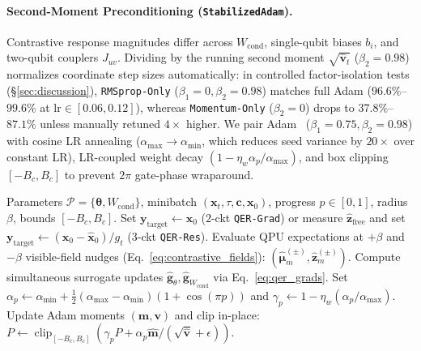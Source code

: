 \documentclass[11pt]{article}
\begin{document}
\paragraph{Second-Moment Preconditioning (\texttt{StabilizedAdam}).}
Contrastive response magnitudes differ across $W_{\text{cond}}$, single-qubit biases $b_i$, and two-qubit couplers $J_{uv}$. Dividing by the running second moment $\sqrt{\hat{\mathbf{v}}_t}$ ($\beta_2{=}0.98$) normalizes coordinate step sizes automatically: in controlled factor-isolation tests (\S\ref{sec:discussion}), \texttt{RMSprop-Only} ($\beta_1{=}0, \beta_2{=}0.98$) matches full Adam ($96.6\%$--$99.6\%$ at $\mathrm{lr}\in[0.06,0.12]$), whereas \texttt{Momentum-Only} ($\beta_2{=}0$) drops to $37.8\%$--$87.1\%$ unless manually retuned $4\times$ higher. We pair Adam~\cite{kingma2015adam} ($\beta_1{=}0.75, \beta_2{=}0.98$) with cosine LR annealing ($\alpha_{\max}{\to}\alpha_{\min}$, which reduces seed variance by $20\times$ over constant LR), LR-coupled weight decay $(1-\eta_w\alpha_p/\alpha_{\max})$, and box clipping $[-B_c, B_c]$ to prevent $2\pi$ gate-phase wraparound.

\begin{algorithm}[t!]
\caption{\texttt{QER-Grad} ($2$-Circuit) / \texttt{QER-Res} ($3$-Circuit) Contrastive Probing + \texttt{StabilizedAdam}}
\label{alg:qer_step}
\begin{algorithmic}[1]
\small
\REQUIRE Parameters $\mathcal{P}=\{\boldsymbol{\theta}, W_{\text{cond}}\}$, minibatch $(\mathbf{x}_t, \tau, \mathbf{c}, \mathbf{x}_0)$, progress $p\in[0,1]$, radius $\beta$, bounds $[-B_c, B_c]$.
\STATE Set $\mathbf{y}_{\text{target}} \leftarrow \mathbf{x}_0$ ($2$-ckt \texttt{QER-Grad}) or measure $\hat{\mathbf{z}}_{\text{free}}$ and set $\mathbf{y}_{\text{target}} \leftarrow (\mathbf{x}_0 - \hat{\mathbf{x}}_0)/g_t$ ($3$-ckt \texttt{QER-Res}).
\STATE Evaluate QPU expectations at $+\beta$ and $-\beta$ visible-field nudges (Eq.~\eqref{eq:contrastive_fields}): $(\hat{\boldsymbol{\mu}}_m^{(\pm)}, \hat{\mathbf{z}}_m^{(\pm)})$.
\STATE Compute simultaneous surrogate updates $\hat{\mathbf{g}}_\theta, \hat{\mathbf{g}}_{W_{\text{cond}}}$ via Eq.~\eqref{eq:qer_grads}.
\STATE Set $\alpha_p \leftarrow \alpha_{\min} + \frac{1}{2}(\alpha_{\max}-\alpha_{\min})(1+\cos(\pi p))$ and $\gamma_p \leftarrow 1-\eta_w(\alpha_p/\alpha_{\max})$.
\STATE Update Adam moments $(\mathbf{m},\mathbf{v})$ and clip in-place: $P \leftarrow \operatorname{clip}_{[-B_c,B_c]}(\gamma_p P + \alpha_p\hat{\mathbf{m}}/(\sqrt{\hat{\mathbf{v}}}+\epsilon))$.
\end{algorithmic}
\end{algorithm}
\end{document}

